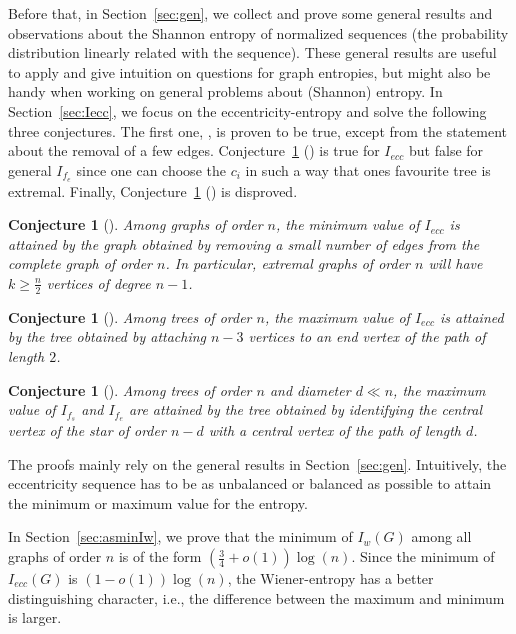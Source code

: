 \documentclass{article}
\newtheorem{conj}[defi]{Conjecture}
\newcommand{\ecc}{ecc}
\begin{document}
{Before that, in Section~\ref{sec:gen}, we collect and prove some general results and observations about the Shannon entropy of normalized sequences (the probability distribution linearly related with the sequence). These general results are useful to apply and give intuition on questions for graph entropies, but might also be handy when working on general problems about (Shannon) entropy.
In Section~\ref{sec:Iecc}, we focus on the eccentricity-entropy and solve the following three conjectures.
The first one, \cite[Conj.~6.2]{KDM13}, is proven to be true, except from the statement about the removal of a few edges. 
Conjecture~\ref{conj_tree_max_diam3} (\cite[Conj. 4.6]{Dehmer_Kraus}) is true for $I_{\ecc}$ but false for general $I_{f_{e}}$ since one can choose the $c_i$ in such a way that ones favourite tree is extremal. 
Finally, Conjecture~\ref{conj_tree_max_wrong} (\cite[Conj. 4.3]{Dehmer_Kraus}) is disproved.

\begin{conj}[\cite{KDM13}]\label{conj_graph_min_diam2}
Among graphs of order $n$, the minimum value of $I_{ecc}$ is attained by the graph obtained by removing a small number of edges from the complete graph of order $n$. In particular, extremal graphs of order $n$ will have $k\geq \frac{n}{2}$ vertices of degree $n-1$.
\end{conj}

\begin{conj}[\cite{Dehmer_Kraus}]\label{conj_tree_max_diam3}
Among trees of order $n$, the maximum value of $I_{\ecc}$ is attained by the tree obtained by attaching $n-3$ vertices to an end vertex of the path of length $2$.
\end{conj}

\begin{conj}[\cite{Dehmer_Kraus}]\label{conj_tree_max_wrong}
Among trees of order $n$ and diameter $d\ll n$, the maximum value of $I_{f_{s}}$ and $I_{f_{e}}$ are attained by the tree obtained by identifying the central vertex of the star of order $n-d$ with a central vertex of the path of length $d$.
\end{conj}

The proofs mainly rely on the general results in Section~\ref{sec:gen}.
Intuitively, the eccentricity sequence has to be as unbalanced or balanced as possible to attain the minimum or maximum value for the entropy. 

In Section~\ref{sec:asminIw}, we prove that the minimum of $I_w(G)$ among all graphs of order $n$ is of the form $\left(\frac 34 +o(1) \right) \log(n).$
Since the minimum of $I_{\ecc}(G)$ is  $(1-o(1))\log(n)$,
the Wiener-entropy has a better distinguishing character, i.e., the difference between the maximum and minimum is larger.

}
\end{document}

